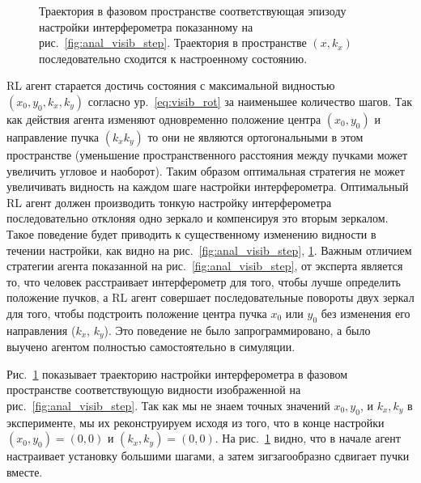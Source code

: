\begin{figure}[ht]
\caption{Траектория в фазовом пространстве соответствующая эпизоду настройки интерферометра показанному на рис.~\ref{fig:anal_visib_step}. Траектория в пространстве $(x, k_x)$ последовательно сходится к настроенному состоянию.}
\label{fig:anal_kx}
\end{figure}

RL агент старается достичь состояния с максимальной видностью  $(x_0,y_0,k_x,k_y)$ согласно ур.~\eqref{eq:visib_rot} за наименьшее количество шагов. Так как действия агента изменяют одновременно положение центра $(x_0, y_0)$ и направление пучка $(k_x k_y)$ то они не являются ортогональными в этом пространстве (уменьшение пространственного расстояния между пучками может увеличить угловое и наоборот). Таким образом оптимальная стратегия не может увеличивать видность на каждом шаге настройки интерферометра. Оптимальный RL агент должен производить тонкую настройку интерферометра последовательно отклоняя одно зеркало и компенсируя это вторым зеркалом. Такое поведение будет приводить к существенному изменению видности в течении настройки, как видно на рис.~\ref{fig:anal_visib_step}, \ref{fig:anal_kx}. Важным отличием стратегии агента показанной на рис.~\ref{fig:anal_visib_step}, от эксперта является то, что человек расстраивает интерферометр для того, чтобы лучше определить положение пучков, а RL агент совершает последовательные повороты двух зеркал для того, чтобы подстроить положение центра пучка $x_0$ или $y_0$ без изменения его направления ($k_x$, $k_y$). Это поведение не было запрограммировано, а было выучено агентом полностью самостоятельно в симуляции.

Рис.~\ref{fig:anal_kx} показывает траекторию настройки интерферометра в фазовом пространстве соответствующую видности изображенной на рис.~\ref{fig:anal_visib_step}. Так как мы не знаем точных значений  $x_0, y_0$, и $k_x, k_y$ в эксперименте, мы их реконструируем исходя из того, что в конце настройки $(x_0, y_0) = (0, 0)$ и $(k_x, k_y) = (0, 0)$. На рис.~\ref{fig:anal_kx} видно, что в начале агент настраивает установку большими шагами, а затем зигзагообразно сдвигает пучки вместе.

